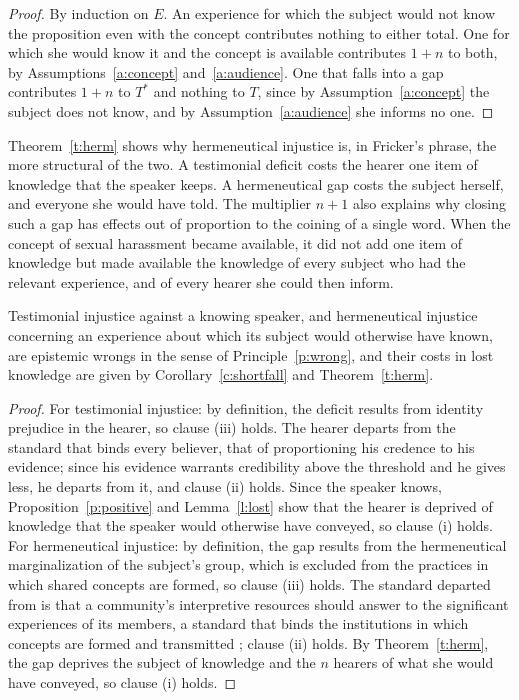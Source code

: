 \documentclass{situationist-preprint}
\begin{document}
\begin{proof}
By induction on $E$. An experience for which the subject would not know the proposition even with the concept contributes nothing to either total. One for which she would know it and the concept is available contributes $1 + n$ to both, by Assumptions~\ref{a:concept} and~\ref{a:audience}. One that falls into a gap contributes $1 + n$ to $T^{*}$ and nothing to $T$, since by Assumption~\ref{a:concept} the subject does not know, and by Assumption~\ref{a:audience} she informs no one.
\end{proof}

Theorem~\ref{t:herm} shows why hermeneutical injustice is, in Fricker's phrase, the more structural of the two. A testimonial deficit costs the hearer one item of knowledge that the speaker keeps. A hermeneutical gap costs the subject herself, and everyone she would have told. The multiplier $n+1$ also explains why closing such a gap has effects out of proportion to the coining of a single word. When the concept of sexual harassment became available, it did not add one item of knowledge but made available the knowledge of every subject who had the relevant experience, and of every hearer she could then inform.

\begin{theorem}\label{t:wrong}
Testimonial injustice against a knowing speaker, and hermeneutical injustice concerning an experience about which its subject would otherwise have known, are epistemic wrongs in the sense of Principle~\ref{p:wrong}, and their costs in lost knowledge are given by Corollary~\ref{c:shortfall} and Theorem~\ref{t:herm}.
\end{theorem}

\begin{proof}
For testimonial injustice: by definition, the deficit results from identity prejudice in the hearer, so clause (iii) holds. The hearer departs from the standard that binds every believer, that of proportioning his credence to his evidence; since his evidence warrants credibility above the threshold and he gives less, he departs from it, and clause (ii) holds. Since the speaker knows, Proposition~\ref{p:positive} and Lemma~\ref{l:lost} show that the hearer is deprived of knowledge that the speaker would otherwise have conveyed, so clause (i) holds. For hermeneutical injustice: by definition, the gap results from the hermeneutical marginalization of the subject's group, which is excluded from the practices in which shared concepts are formed, so clause (iii) holds. The standard departed from is that a community's interpretive resources should answer to the significant experiences of its members, a standard that binds the institutions in which concepts are formed and transmitted \citep{Anderson2012}; clause (ii) holds. By Theorem~\ref{t:herm}, the gap deprives the subject of knowledge and the $n$ hearers of what she would have conveyed, so clause (i) holds.
\end{proof}
\end{document}
